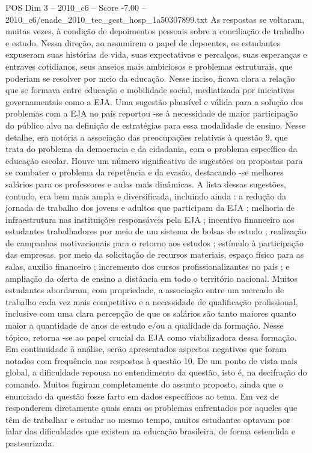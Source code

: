 \begin{textsample}{POS Dim 3 – 2010\_c6 – Score -7.00 – 2010\_c6/enade\_2010\_tec\_gest\_hosp\_1a50307899.txt}
As respostas se voltaram, muitas vezes, à condição de depoimentos pessoais sobre a conciliação de trabalho e estudo.
Nessa direção, ao assumirem o papel de depoentes, os estudantes expuseram suas histórias de vida, suas expectativas e percalços, suas esperanças e entraves cotidianos, seus anseios mais ambiciosos e problemas estruturais, que poderiam se resolver por meio da educação.
Nesse inciso, ficava clara a relação que se formava entre educação e mobilidade social, mediatizada por iniciativas governamentais como a EJA.
Uma sugestão plausível e válida para a solução dos problemas com a EJA no país reportou -se à necessidade de maior participação do público alvo na definição de estratégias para essa modalidade de ensino.
Nesse detalhe, era notória a associação das preocupações relativas à questão 9, que trata do problema da democracia e da cidadania, com o problema específico da educação escolar.
Houve um número significativo de sugestões ou propostas para se combater o problema da repetência e da evasão, destacando -se melhores salários para os professores e aulas mais dinâmicas.
A lista dessas sugestões, contudo, era bem mais ampla e diversificada, incluindo ainda : a redução da jornada de trabalho dos jovens e adultos que participam da EJA ; melhoria de infraestrutura nas instituições responsáveis pela EJA ; incentivo financeiro aos estudantes trabalhadores por meio de um sistema de bolsas de estudo ; realização de campanhas motivacionais para o retorno aos estudos ; estímulo à participação das empresas, por meio da solicitação de recursos materiais, espaço físico para as salas, auxílio financeiro ; incremento dos cursos profissionalizantes no país ; e ampliação da oferta de ensino a distância em todo o território nacional.
Muitos estudantes abordaram, com propriedade, a associação entre um mercado de trabalho cada vez mais competitivo e a necessidade de qualificação profissional, inclusive com uma clara percepção de que os salários são tanto maiores quanto maior a quantidade de anos de estudo e/ou a qualidade da formação.
Nesse tópico, retorna -se ao papel crucial da EJA como viabilizadora dessa formação.
Em continuidade à análise, serão apresentados aspectos negativos que foram notados com frequência nas respostas à questão 10.
De um ponto de vista mais global, a dificuldade repousa no entendimento da questão, isto é, na decifração do comando.
Muitos fugiram completamente do assunto proposto, ainda que o enunciado da questão fosse farto em dados específicos ao tema.
Em vez de responderem diretamente quais eram os problemas enfrentados por aqueles que têm de trabalhar e estudar ao mesmo tempo, muitos estudantes optavam por falar das dificuldades que existem na educação brasileira, de forma estendida e pasteurizada.

\end{textsample}
